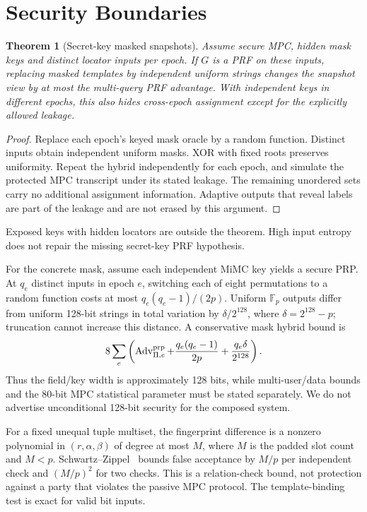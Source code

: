 \documentclass[journal]{IEEEtran}
\newcommand{\Adv}{\operatorname{Adv}}
\newtheorem{theorem}{Theorem}
\begin{document}
\section{Security Boundaries}
\begin{theorem}[Secret-key masked snapshots]
Assume secure MPC, hidden mask keys and distinct locator inputs per epoch. If $G$ is a PRF on these inputs, replacing masked templates by independent uniform strings changes the snapshot view by at most the multi-query PRF advantage. With independent keys in different epochs, this also hides cross-epoch assignment except for the explicitly allowed leakage.
\end{theorem}
\begin{proof}
Replace each epoch's keyed mask oracle by a random function. Distinct inputs obtain independent uniform masks. XOR with fixed roots preserves uniformity. Repeat the hybrid independently for each epoch, and simulate the protected MPC transcript under its stated leakage. The remaining unordered sets carry no additional assignment information. Adaptive outputs that reveal labels are part of the leakage and are not erased by this argument.
\end{proof}
Exposed keys with hidden locators are outside the theorem. High input entropy does not repair the missing secret-key PRF hypothesis.

For the concrete mask, assume each independent MiMC key yields a secure PRP. At $q_e$ distinct inputs in epoch $e$, switching each of eight permutations to a random function costs at most $q_e(q_e-1)/(2p)$. Uniform $\mathbb F_p$ outputs differ from uniform 128-bit strings in total variation by $\delta/2^{128}$, where $\delta=2^{128}-p$; truncation cannot increase this distance. A conservative mask hybrid bound is
\begin{equation}
8\sum_e\left(\Adv_{\Pi,e}^{\rm prp}+\frac{q_e(q_e-1)}{2p}
+\frac{q_e\delta}{2^{128}}\right).
\end{equation}
Thus the field/key width is approximately 128 bits, while multi-user/data bounds and the 80-bit MPC statistical parameter must be stated separately. We do not advertise unconditional 128-bit security for the composed system.

For a fixed unequal tuple multiset, the fingerprint difference is a nonzero polynomial in $(r,\alpha,\beta)$ of degree at most $M$, where $M$ is the padded slot count and $M<p$. Schwartz--Zippel~\cite{schwartz1980fast} bounds false acceptance by $M/p$ per independent check and $(M/p)^2$ for two checks. This is a relation-check bound, not protection against a party that violates the passive MPC protocol. The template-binding test is exact for valid bit inputs.
\end{document}

